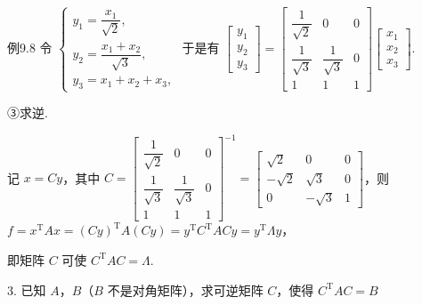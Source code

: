 \begin{fcard}{例9.8}
令 $\begin{cases}y_1=\dfrac{x_1}{\sqrt2},\\[8pt]y_2=\dfrac{x_1+x_2}{\sqrt3},\\[8pt]y_3=x_1+x_2+x_3,\end{cases}$ 于是有 $\begin{bmatrix}y_1\\y_2\\y_3\end{bmatrix}=\begin{bmatrix}\dfrac{1}{\sqrt2}&0&0\\[8pt]\dfrac{1}{\sqrt3}&\dfrac{1}{\sqrt3}&0\\[8pt]1&1&1\end{bmatrix}\begin{bmatrix}x_1\\x_2\\x_3\end{bmatrix}$.

③求逆.

记 $x=Cy$，其中 $C=\begin{bmatrix}\dfrac{1}{\sqrt2}&0&0\\[8pt]\dfrac{1}{\sqrt3}&\dfrac{1}{\sqrt3}&0\\[8pt]1&1&1\end{bmatrix}^{-1}=\begin{bmatrix}\sqrt2&0&0\\-\sqrt2&\sqrt3&0\\0&-\sqrt3&1\end{bmatrix}$，则 $f=x^{\mathrm T}Ax=(Cy)^{\mathrm T}A(Cy)=y^{\mathrm T}C^{\mathrm T}ACy=y^{\mathrm T}\Lambda y$，

即矩阵 $C$ 可使 $C^{\mathrm T}AC=\Lambda$.
\end{fcard}

3. 已知 $A$，$B$（$B$ 不是对角矩阵），求可逆矩阵 $C$，使得 $C^{\mathrm T}AC=B$

